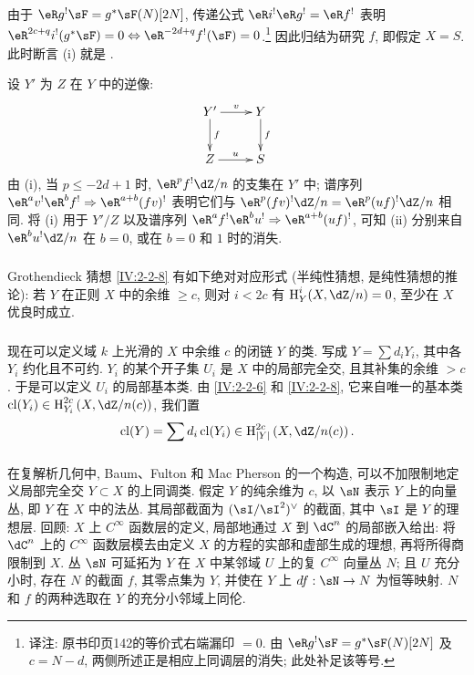 由于 $\eR g^! \sF=g^*\sF(N)[2N]$, 传递公式
$\eR i^!\eR g^!=\eR f^!$ 表明
$\eR^{2 c+q} i^!(g^*\sF)=0\Leftrightarrow \eR^{-2 d+q}f^!(\sF)=0$.\footnote{译注: 原书印页142的等价式右端漏印 $=0$. 由 $\eR g^!\sF=g^*\sF(N)[2N]$ 及 $c=N-d$, 两侧所述正是相应上同调层的消失; 此处补足该等号.}
因此归结为研究 $f$, 即假定 $X=S$. 此时断言 (i) 就是 \cite[XVIII 3.17]{sga4}.

设 $Y'$ 为 $Z$ 在 $Y$ 中的逆像:
\[\xymatrix{
  Y' \ar[r]^-v \ar[d]^-f
    & Y \ar[d]^-f \\
  Z \ar[r]^-u
    & S
}\]
由 (i), 当 $p\leqslant -2 d+1$ 时, $\eR^p f^! \dZ/n$ 的支集在 $Y'$ 中;
谱序列 $\eR^a v^!\eR^b f^! \Rightarrow \eR^{a+b} (f v)^!$
表明它们与 $\eR^p(f v)^!\dZ/n=\eR^p(u f)^!\dZ/n$ 相同.
将 (i) 用于 $Y'/Z$ 以及谱序列
$\eR^a f^!\eR^b u^! \Rightarrow \eR^{a+b} (u f)^!$,
可知 (ii) 分别来自 $\eR^b u^! \dZ/n$ 在 $b=0$, 或在 $b=0$ 和 $1$ 时的消失.

\subsubsection{}\label{IV:2-2-9}

Grothendieck 猜想 \ref{IV:2-2-8} 有如下绝对对应形式
(半纯性猜想, 是纯性猜想的推论): 若 $Y$ 在正则 $X$ 中的余维 $\geqslant c$,
则对 $i<2 c$ 有 $\h_Y^i(X,\dZ/n)=0$, 至少在 $X$ 优良时成立.

\subsubsection{}\label{IV:2-2-10}

现在可以定义域 $k$ 上光滑的 $X$ 中余维 $c$ 的闭链 $Y$ 的类.
写成 $Y=\sum d_i Y_i$, 其中各 $Y_i$ 约化且不可约.
$Y_i$ 的某个开子集 $U_i$ 是 $X$ 中的局部完全交, 且其补集的余维 $>c$.
于是可以定义 $U_i$ 的局部基本类.
由 \ref{IV:2-2-6} 和 \ref{IV:2-2-8}, 它来自唯一的基本类
$\cl(Y_i)\in \h_{Y_i}^{2 c}\left(X,\dZ/n(c)\right)$, 我们置
\[
  \cl(Y) = \sum d_i \cl(Y_i) \in \h_{|Y|}^{2 c}\left(X,\dZ/n(c)\right) \text{.}
\]

\subsubsection{}\label{IV:2-2-11}

在复解析几何中, Baum、Fulton 和 Mac Pherson \cite{bfm75} 的一个构造,
可以不加限制地定义局部完全交 $Y\subset X$ 的上同调类.
假定 $Y$ 的纯余维为 $c$, 以 $\sN$ 表示 $Y$ 上的向量丛, 即 $Y$ 在 $X$ 中的法丛.
其局部截面为 $(\sI/\sI^2)^\vee$ 的截面, 其中 $\sI$ 是 $Y$ 的理想层.
回顾: $X$ 上 $C^\infty$ 函数层的定义, 局部地通过 $X$ 到 $\dC^n$ 的局部嵌入给出:
将 $\dC^n$ 上的 $C^\infty$ 函数层模去由定义 $X$ 的方程的实部和虚部生成的理想,
再将所得商限制到 $X$.
丛 $\sN$ 可延拓为 $Y$ 在 $X$ 中某邻域 $U$ 上的复 $C^\infty$ 向量丛 $N$;
且 $U$ 充分小时, 存在 $N$ 的截面 $f$, 其零点集为 $Y$,
并使在 $Y$ 上 $d f:\sN\to N$ 为恒等映射.
$N$ 和 $f$ 的两种选取在 $Y$ 的充分小邻域上同伦.


